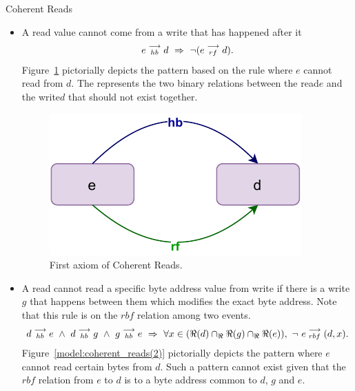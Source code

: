 \begin{axiom}{Coherent Reads}
            \begin{itemize}
                \item A read value cannot come from a write that has happened after it 
                    \begin{align*}
                        \reln{e}{hb}{d}\ \Rightarrow{}\ \neg(\reln{e}{rf}{d}).
                    \end{align*}
                    Figure~\ref{model:coherent_reads(1)} pictorially depicts the pattern based on the rule where $e$ cannot read from $d$.
                    The represents the two binary relations between the read$e$ and the write$d$ that should not exist together.
                    \begin{figure}[H]
                        \centering
                        \includegraphics[scale=0.7]{3.ECMAScriptMemoryModel/CoherentReads1.pdf}
                        \caption{First axiom of Coherent Reads.}
                        \label{model:coherent_reads(1)}
                    \end{figure}
                \item A read cannot read a specific byte address value from write if there is a write $g$ that happens between them which modifies the exact byte address. Note that this rule is on the $rbf$ relation among two events. 
                    \begin{align*}
                        \reln{d}{hb}{e}
                        \ \wedge \ 
                        \reln{d}{hb}{g} \ \wedge \  \reln{g}{hb}{e}
                        \ \Rightarrow{} \
                        \forall x \in (\Re(d) \cap_\Re \Re(g) \cap_\Re \Re(e)), \ \neg \ \reln{e}{rbf}{(d,x)}.
                    \end{align*}
                    Figure~\ref{model:coherent_reads(2)} pictorially depicts the pattern where $e$ cannot read certain bytes from $d$. 
                    Such a pattern cannot exist given that the $rbf$ relation from $e$ to $d$ is to a byte address common to $d$, $g$ and $e$. 

\end{itemize}
\end{axiom}
